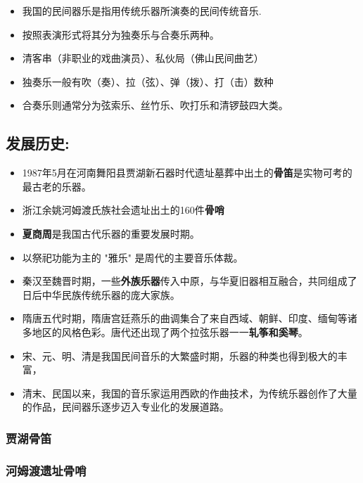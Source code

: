 \documentclass[
]{article}
\providecommand{\tightlist}{%
  \setlength{\itemsep}{0pt}\setlength{\parskip}{0pt}}
\begin{document}
\begin{itemize}
\tightlist
\item
  我国的民间器乐是指用传统乐器所演奏的民间传统音乐.
\item
  按照表演形式将其分为独奏乐与合奏乐两种。
\item
  清客串（非职业的戏曲演员）、私伙局（佛山民间曲艺）
\item
  独奏乐一般有吹（奏）、拉（弦）、弹（拨）、打（击）数种
\item
  合奏乐则通常分为弦索乐、丝竹乐、吹打乐和清锣鼓四大类。
\end{itemize}

\subsection{发展历史:}\label{ux53d1ux5c55ux5386ux53f2}

\begin{itemize}
\tightlist
\item
  1987年5月在河南舞阳县贾湖新石器时代遗址墓葬中出土的\textbf{骨笛}是实物可考的最古老的乐器。
\item
  浙江余姚河姆渡氏族社会遗址出土的160件\textbf{骨哨}
\item
  \textbf{夏商周}是我国古代乐器的重要发展时期。
\item
  以祭祀功能为主的 "雅乐" 是周代的主要音乐体裁。
\item
  秦汉至魏晋时期，一些\textbf{外族乐器}传入中原，与华夏旧器相互融合，共同组成了日后中华民族传统乐器的庞大家族。
\item
  隋唐五代时期，隋唐宫廷燕乐的曲调集合了来自西域、朝鲜、印度、缅甸等诸多地区的风格色彩。唐代还出现了两个拉弦乐器一一\textbf{轧筝和奚琴}。
\item
  宋、元、明、清是我国民间音乐的大繁盛时期，乐器的种类也得到极大的丰富，
\item
  清末、民国以来，我国的音乐家运用西欧的作曲技术，为传统乐器创作了大量的作品，民间器乐逐步迈入专业化的发展道路。
\end{itemize}

\subsubsection{贾湖骨笛}\label{ux8d3eux6e56ux9aa8ux7b1b}

\subsubsection{河姆渡遗址骨哨}\label{ux6cb3ux59c6ux6e21ux9057ux5740ux9aa8ux54e8}
\end{document}
